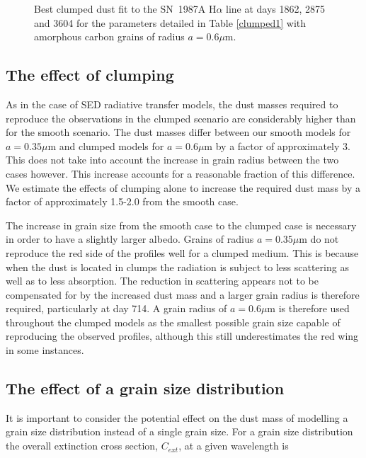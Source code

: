 \documentclass[useAMS,usenatbib,usegraphicx]{mnras}
\begin{document}
\begin{figure}
\caption{Best clumped dust fit to the SN~1987A  H$\alpha$ line at days 1862, 2875 and 
3604 for the parameters detailed in Table \ref{clumped1} with amorphous carbon grains of radius $a=0.6\mu$m.}
\label{d1862_3604_c}

\end{figure}

\subsection{The effect of clumping}


As in the case of SED radiative transfer models, the dust masses required to reproduce the 
observations in the clumped scenario are considerably higher than for the smooth scenario.  The dust masses differ between our smooth models for $a=0.35\mu$m and clumped models for $a=0.6\mu$m by a factor of approximately 3.  This does not take into account the increase in grain radius between the two cases however.  This increase accounts for a reasonable fraction of this difference. We estimate the effects of clumping alone to increase the required dust mass by a factor of approximately 1.5-2.0 from the smooth case.

The increase in grain size from the smooth case to the clumped case is necessary in order to have a slightly larger albedo.  Grains of radius $a=0.35 \mu$m do not reproduce the red side of the profiles well for a clumped medium.  This is because when 
the dust is located in clumps the radiation is subject to less scattering 
as well as to less absorption.  The reduction in scattering appears not to be 
compensated for by the increased dust mass and a larger grain radius is 
therefore required, particularly at day 714.  A grain radius of $a=0.6\mu$m 
is therefore used throughout the clumped models as the smallest possible 
grain size capable of reproducing the observed profiles, although this still underestimates the red wing in some instances. 




\subsection{The effect of a grain size distribution}
\label{gs_distn}
It is important to consider the potential effect on the dust mass of modelling a grain size distribution instead of a single grain size.  For a grain size distribution the overall extinction cross section, $C_{ext}$, at a given wavelength is 
\end{document}
